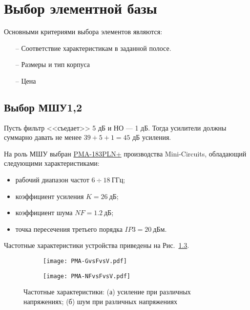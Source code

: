 \chapter{Выбор элементной базы}

Основными критериями выбора элементов являются:

\begin{itemize}
	\item[--] Соответствие характеристикам в заданной полосе.
	\item[--] Размеры и тип корпуса
	\item[--] Цена
\end{itemize}

\section{Выбор МШУ1,2}

Пусть фильтр <<съедает>> 5 дБ и НО --- 1 дБ. Тогда усилители должны суммарно давать 
не менее $39+5+1=45$ дБ усиления.

На роль МШУ выбран \href{https://www.minicircuits.com/WebStore/dashboard.html?model=PMA-183PLN\%2B}{PMA-183PLN+} производства Mini-Circuits, обладающий следующими характеристиками:
\begin{itemize}
	\item 
	рабочий диапазон частот $6 \div 18~\text{ГГц}$;
	\item
	коэффициент усиления $K = 26~\text{дБ}$;
	\item
	коэффициент шума $NF = 1.2~\text{дБ}$;
	\item
	точка пересечения третьего порядка $IP3 = 20~\text{дБм}$.
\end{itemize}

Частотные характеристики устройства приведены на Рис.~\ref{fig:LNA_responses}.

\begin{figure}[H]
	\centering
	\begin{subfigure}[b]{0.45\textwidth}
		\centering
		\texttt{[image: PMA-GvsFvsV.pdf]}
		\caption{}%
		\label{fig:LNA_gain}
	\end{subfigure}
	\hfill
	\begin{subfigure}[b]{0.45\textwidth}
		\centering
		\texttt{[image: PMA-NFvsFvsV.pdf]}
		\caption{}%
		\label{fig:LNA_NF}
	\end{subfigure}
	\caption{%
		Частотные характеристики:
		(а) усиление при различных напряжениях;
		(б) шум  при различных напряжениях
	}%
	\label{fig:LNA_responses}
\end{figure}


